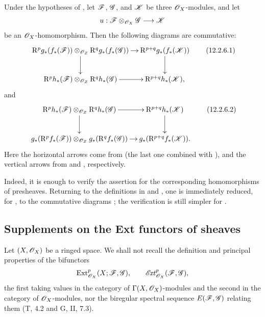 \begin{env}[12.2.6]
\label{0.12.2.6}
Under the hypotheses of , let $\mathscr{F}$, $\mathscr{G}$,
and $\mathscr{K}$ be three $\mathscr{O}_X$-modules, and let
\[
  u:\mathscr{F}\otimes_{\mathscr{O}_X}\mathscr{G}\longrightarrow\mathscr{K}
\]
be an $\mathscr{O}_X$-homomorphism.
Then the following diagrams are commutative:
\[
  \xymatrix@C=10pt@R=24pt{
    \RR^p g_*(f_*(\sh{F}))
      \otimes_{\sh{O}_Z}\RR^q g_*(f_*(\sh{G}))
      \ar[r]\ar[d]
      & \RR^{p+q}g_*(f_*(\sh{K}))\ar[d]\\
    \RR^p h_*(\sh{F})
      \otimes_{\sh{O}_Z}\RR^q h_*(\sh{G})
      \ar[r]
      & \RR^{p+q}h_*(\sh{K}),
  }
  \tag{12.2.6.1}
  \label{0.12.2.6.1}
\]
and
\[
  \xymatrix@C=10pt@R=24pt{
    \RR^p h_*(\sh{F})
      \otimes_{\sh{O}_Z}\RR^q h_*(\sh{G})
      \ar[r]\ar[d]
      & \RR^{p+q}h_*(\sh{K})\ar[d]\\
    g_*(\RR^p f_*(\sh{F}))
      \otimes_{\sh{O}_Z}g_*(\RR^q f_*(\sh{G}))
      \ar[r]
      & g_*(\RR^{p+q}f_*(\sh{K})).
  }
  \tag{12.2.6.2}
  \label{0.12.2.6.2}
\]
Here the horizontal arrows come from  (the last one
combined with ), and the vertical
arrows from  and , respectively.

Indeed, it is enough to verify the assertion for the corresponding
homomorphisms of presheaves.  Returning to the definitions in
 and , one is immediately reduced, for
, to the commutative diagrams
; the verification is still simpler for
.
\end{env}

\subsection{Supplements on the Ext functors of sheaves}
\label{subsection:0.12.3}

\begin{env}[12.3.1]
\label{0.12.3.1}
Let $(X,\mathscr{O}_X)$ be a ringed space.
We shall not recall the definition and principal properties of the
bifunctors
\[
  \operatorname{Ext}^p_{\mathscr{O}_X}(X;\mathscr{F},\mathscr{G}),
  \qquad
  \mathscr{E}\!\mathit{xt}^p_{\mathscr{O}_X}(\mathscr{F},\mathscr{G}),
\]
the first taking values in the category of
$\Gamma(X,\mathscr{O}_X)$-modules and the second in the category of
$\mathscr{O}_X$-modules, nor the biregular spectral sequence
$E(\mathscr{F},\mathscr{G})$ relating them (T, 4.2 and G, II, 7.3).
\end{env}

